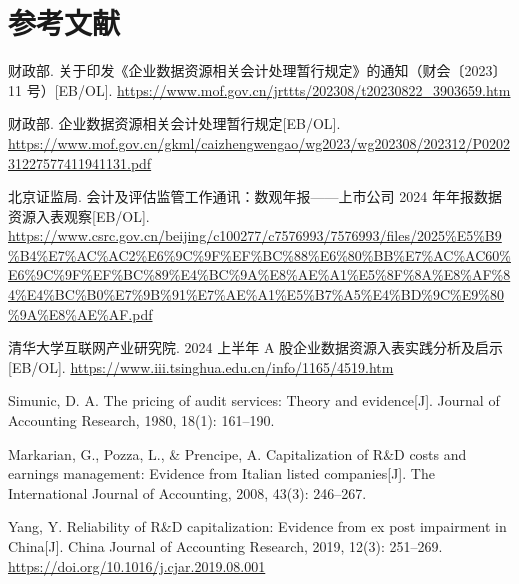 \documentclass[UTF8,zihao=-4,a4paper]{ctexart}
\begin{document}
\section*{参考文献}

\begin{enumerate}[label={[\arabic*]},leftmargin=2.2em]
  \item 财政部. 关于印发《企业数据资源相关会计处理暂行规定》的通知（财会〔2023〕11 号）[EB/OL]. \url{https://www.mof.gov.cn/jrttts/202308/t20230822_3903659.htm}
  \item 财政部. 企业数据资源相关会计处理暂行规定[EB/OL]. \url{https://www.mof.gov.cn/gkml/caizhengwengao/wg2023/wg202308/202312/P020231227577411941131.pdf}
  \item 北京证监局. 会计及评估监管工作通讯：数观年报——上市公司 2024 年年报数据资源入表观察[EB/OL]. \url{https://www.csrc.gov.cn/beijing/c100277/c7576993/7576993/files/2025%E5%B9%B4%E7%AC%AC2%E6%9C%9F%EF%BC%88%E6%80%BB%E7%AC%AC60%E6%9C%9F%EF%BC%89%E4%BC%9A%E8%AE%A1%E5%8F%8A%E8%AF%84%E4%BC%B0%E7%9B%91%E7%AE%A1%E5%B7%A5%E4%BD%9C%E9%80%9A%E8%AE%AF.pdf}
  \item 清华大学互联网产业研究院. 2024 上半年 A 股企业数据资源入表实践分析及启示[EB/OL]. \url{https://www.iii.tsinghua.edu.cn/info/1165/4519.htm}
  \item Simunic, D. A. The pricing of audit services: Theory and evidence[J]. Journal of Accounting Research, 1980, 18(1): 161--190.
  \item Markarian, G., Pozza, L., \& Prencipe, A. Capitalization of R\&D costs and earnings management: Evidence from Italian listed companies[J]. The International Journal of Accounting, 2008, 43(3): 246--267.
  \item Yang, Y. Reliability of R\&D capitalization: Evidence from ex post impairment in China[J]. China Journal of Accounting Research, 2019, 12(3): 251--269. \url{https://doi.org/10.1016/j.cjar.2019.08.001}
\end{enumerate}
\end{document}

